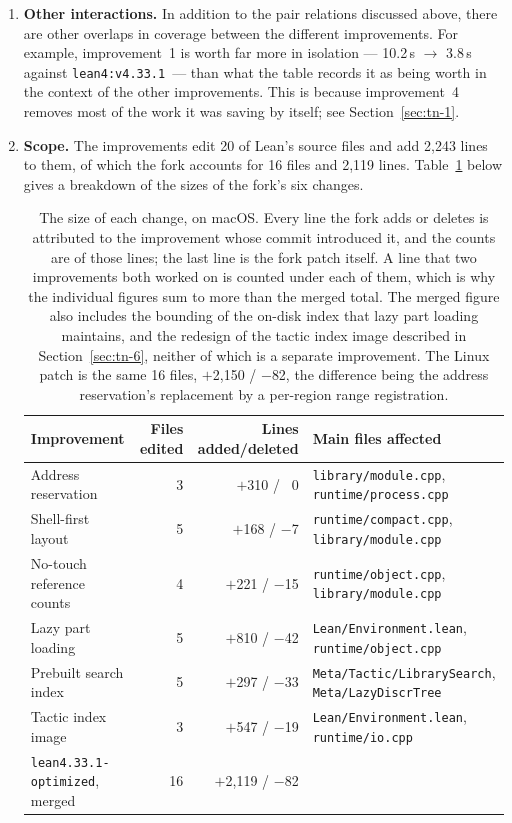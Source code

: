 \documentclass{article}
\newcommand{\Lean}{Lean\xspace}      %
\newcommand{\currentlean}{\texttt{lean4:v4.33.1}\xspace}
\newcommand{\altlean}{\texttt{lean4.33.1-\allowbreak optimized}\xspace}
\begin{document}
\begin{enumerate}
\item \textbf{Other interactions.} In addition to the pair relations discussed above, there are other overlaps in coverage between the different improvements. For example, improvement~1 is worth far more in isolation --- 10.2\,s $\to$ 3.8\,s against \currentlean\ --- than what the table records it as being worth in the context of the other improvements. This is because improvement~4 removes most of the work it was saving by itself; see Section~\ref{sec:tn-1}.

\item \textbf{Scope.} The improvements edit 20 of \Lean's source files and add 2{,}243 lines to them, of which the fork accounts for 16 files and 2{,}119 lines. Table~\ref{tab:diffstat} below gives a breakdown of the sizes of the fork's six changes.

\begin{table}[htbp]
\centering
\footnotesize
\setlength{\tabcolsep}{3pt}
\begin{tabular}{lrrl}
\toprule
Improvement & Files edited & Lines added/deleted & Main files affected \\
\midrule
Address reservation & 3 & $+$310 / \  \phantom{$-$}$0$ & \texttt{library/module.cpp}, \texttt{runtime/process.cpp} \\
Shell-first layout & 5 & $+$168 / \hspace{1pt} $-$7 & \texttt{runtime/compact.cpp}, \texttt{library/module.cpp} \\
No-touch reference counts & 4 & $+$221 / $-$15 & \texttt{runtime/object.cpp}, \texttt{library/module.cpp} \\
Lazy part loading & 5 & $+$810 / $-$42 & \texttt{Lean/Environment.lean}, \texttt{runtime/object.cpp} \\
Prebuilt search index & 5 & $+$297 / $-$33 & \texttt{Meta/Tactic/LibrarySearch}, \texttt{Meta/LazyDiscrTree} \\
Tactic index image & 3 & $+$547 / $-$19 & \texttt{Lean/Environment.lean}, \texttt{runtime/io.cpp} \\
\midrule
\altlean, merged & 16 & $+$2{,}119 / $-$82 \hspace{-3pt} & \\
\bottomrule
\end{tabular}
\caption{The size of each change, on macOS. Every line the fork adds or deletes is attributed to the improvement whose commit introduced it, and the counts are of those lines; the last line is the fork patch itself. A line that two improvements both worked on is counted under each of them, which is why the individual figures sum to more than the merged total. The merged figure also includes the bounding of the on-disk index that lazy part loading maintains, and the redesign of the tactic index image described in Section~\ref{sec:tn-6}, neither of which is a separate improvement. The Linux patch is the same 16 files, $+$2{,}150 / $-$82, the difference being the address reservation's replacement by a per-region range registration. 
}
\label{tab:diffstat}
\end{table}


\end{enumerate}
\end{document}
